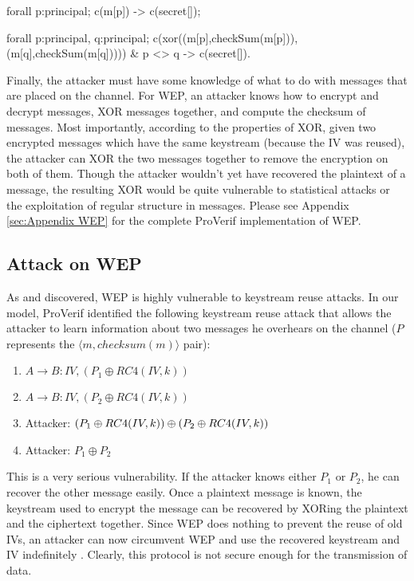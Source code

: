 \documentclass[11pt, twocolumn]{article} %
\begin{document}
{ %
 \begin{verbatimtab}[4] 
forall p:principal; c(m[p]) -> c(secret[]);

forall p:principal, q:principal; 
	c(xor((m[p],checkSum(m[p])),
		(m[q],checkSum(m[q])))) 
			& p <> q -> c(secret[]).
\end{verbatimtab}

Finally, the attacker must have some knowledge of what to do with messages that are placed on the channel.  For WEP, an attacker knows how to encrypt and decrypt messages, XOR messages together, and compute the checksum of messages.  Most importantly, according to the properties of XOR, given two encrypted messages which have the same keystream (because the IV was reused), the attacker can XOR the two messages together to remove the encryption on both of them.  Though the attacker wouldn't yet have recovered the plaintext of a message, the resulting XOR would be quite vulnerable to statistical attacks or the exploitation of regular structure in messages.  Please see Appendix \ref{sec:Appendix WEP} for the complete ProVerif implementation of WEP.
\subsection{Attack on WEP}
As \cite{lafourcade10} and \cite{borisov01} discovered, WEP is highly vulnerable to keystream reuse attacks.  In our model, ProVerif identified the following keystream reuse attack that allows the attacker to learn information about two messages he overhears on the channel ($P$ represents the $\langle m, checksum(m)\rangle$ pair):

\begin{enumerate}
\item $A\rightarrow B:  IV, (P_1 \oplus RC4(IV, k))$
\item $A \rightarrow B: IV, (P_2 \oplus RC4(IV, k))$
\item Attacker: $(P_1 \oplus RC4(IV, k)) \oplus \\(P_2 \oplus RC4(IV, k))$
\item Attacker: $P_1 \oplus P_2$
\end{enumerate}

This is a very serious vulnerability.  If the attacker knows either $P_1$ or $P_2$, he can recover the other message easily.  Once a plaintext message is known, the keystream used to encrypt the message can be recovered by XORing the plaintext and the ciphertext together.  Since WEP does nothing to prevent the reuse of old IVs, an attacker can now circumvent WEP and use the recovered keystream and IV indefinitely \cite{borisov01}.  Clearly, this protocol is not secure enough for the transmission of data.


}
\end{document}
